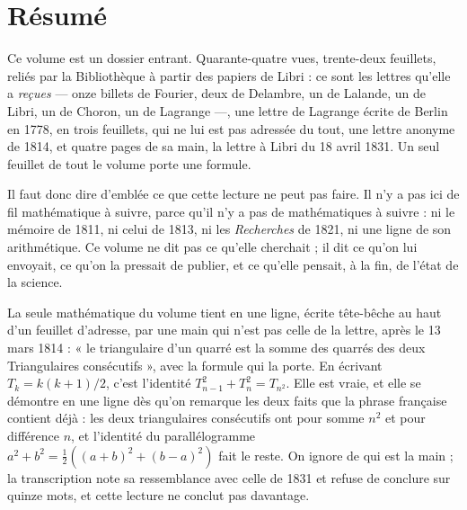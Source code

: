 \documentclass[11pt,a4paper]{article}
\begin{document}
\section*{Résumé}

\begin{resume}
Ce volume est un dossier entrant. Quarante-quatre vues, trente-deux feuillets,
reliés par la Bibliothèque à partir des papiers de Libri : ce sont les lettres
qu'elle a \emph{reçues} — onze billets de Fourier, deux de Delambre, un de
Lalande, un de Libri, un de Choron, un de Lagrange —, une lettre de
Lagrange écrite de Berlin en 1778, en trois feuillets, qui ne lui est pas adressée du tout,
une lettre anonyme de 1814, et quatre pages de sa main, la lettre à Libri du
18 avril 1831. Un seul feuillet de tout le volume porte une formule.

Il faut donc dire d'emblée ce que cette lecture ne peut pas faire. Il n'y a
pas ici de fil mathématique à suivre, parce qu'il n'y a pas de mathématiques à
suivre : ni le mémoire de 1811, ni celui de 1813, ni les \emph{Recherches} de
1821, ni une ligne de son arithmétique. Ce volume ne dit pas ce qu'elle
cherchait ; il dit ce qu'on lui envoyait, ce qu'on la pressait de publier, et
ce qu'elle pensait, à la fin, de l'état de la science.

La seule mathématique du volume tient en une ligne, écrite tête-bêche au haut
d'un feuillet d'adresse, par une main qui n'est pas celle de la lettre, après
le 13 mars 1814 : « le triangulaire d'un quarré est la somme des quarrés des
deux Triangulaires consécutifs », avec la formule qui la porte. En écrivant
$T_k = k(k+1)/2$, c'est l'identité $T_{n-1}^2 + T_n^2 = T_{n^2}$. Elle est
vraie, et elle se démontre en une ligne dès qu'on remarque les deux faits que
la phrase française contient déjà : les deux triangulaires consécutifs ont
pour somme $n^2$ et pour différence $n$, et l'identité du parallélogramme
$a^2+b^2 = \tfrac12((a+b)^2+(b-a)^2)$ fait le reste. On ignore de qui est la
main ; la transcription note sa ressemblance avec celle de 1831 et refuse de
conclure sur quinze mots, et cette lecture ne conclut pas davantage.


\end{resume}
\end{document}
